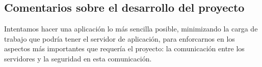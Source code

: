\documentclass[9pt]{article}
\begin{document}
\subsection*{Comentarios sobre el desarrollo del proyecto}
Intentamos hacer una aplicación lo más sencilla posible, minimizando la carga de trabajo que podría tener el servidor de aplicación, para enforcarnos en los aspectos más importantes que requería el proyecto: la comunicación entre los servidores y la seguridad en esta comunicación. %
\end{document}
